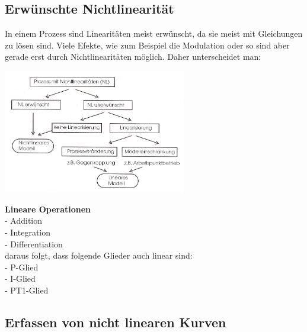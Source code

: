 	\subsection{Erwünschte Nichtlinearität }
		In einem Prozess sind Linearitäten meist erwünscht, da sie meist mit
		Gleichungen zu lösen sind.
		Viele Efekte, wie zum Beispiel die Modulation oder so sind aber gerade erst
		durch Nichtlinearitäten möglich. Daher unterscheidet man:\\
	\begin{minipage}[c]{8cm}
		\includegraphics[width=8cm]{./bilder/Liste_Nichtlinearitaeten.jpg}
	\end{minipage}
	\begin{minipage}[c]{8cm}
		\textbf{Lineare Operationen} \\
		- Addition \\
		- Integration \\
		- Differentiation \\
		daraus folgt, dass folgende Glieder auch linear sind: \\
		- P-Glied \\
		- I-Glied \\
		- PT1-Glied
	\end{minipage}
	\subsection{Erfassen von nicht linearen Kurven}

